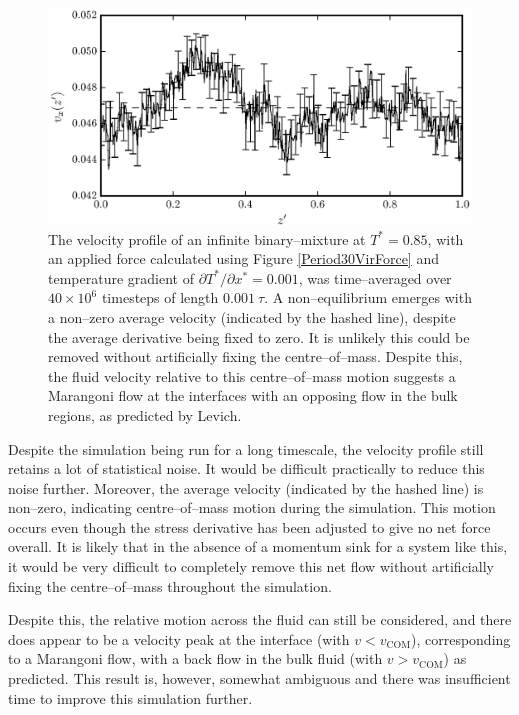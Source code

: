 \begin{figure}[h!]
\centering
\includegraphics[scale=1.0]{Period30VirFlow}
\caption{The velocity profile of an infinite binary--mixture at $T^{*}=0.85$, with an applied force calculated using Figure \ref{Period30VirForce} and temperature gradient of $\partial T^{*} / \partial x^{*} = 0.001$, was time--averaged over $40 \times 10^{6}$ timesteps of length $0.001\ \tau$.
A non--equilibrium emerges with a non--zero average velocity (indicated by the hashed line), despite the average derivative being fixed to zero.
It is unlikely this could be removed without artificially fixing the centre--of--mass.
Despite this, the fluid velocity relative to this centre--of--mass motion suggests a Marangoni flow at the interfaces with an opposing flow in the bulk regions, as predicted by Levich.\cite{Levich}
}
\label{Period30VirFlow}
\end{figure}

Despite the simulation being run for a long timescale, the velocity profile still retains a lot of statistical noise.
It would be difficult practically to reduce this noise further.
Moreover, the average velocity (indicated by the hashed line) is non--zero, indicating centre--of--mass motion during the simulation.
This motion occurs even though the stress derivative has been adjusted to give no net force overall.
It is likely that in the absence of a momentum sink for a system like this, it would be very difficult to completely remove this net flow without artificially fixing the centre--of--mass throughout the simulation.

Despite this, the relative motion across the fluid can still be considered, and there does appear to be a velocity peak at the interface (with $v < v_{\mathrm{COM}}$), corresponding to a Marangoni flow, with a back flow in the bulk fluid (with $v > v_{\mathrm{COM}}$) as predicted.
This result is, however, somewhat ambiguous and there was insufficient time to improve this simulation further.

